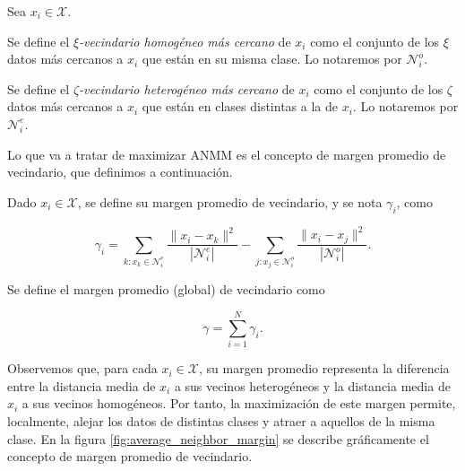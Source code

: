 \documentclass{book}
\begin{document}
\begin{definition}
	Sea $x_i \in \mathcal{X}$.
	
	Se define el \emph{$\xi$-vecindario homogéneo más cercano} de $x_i$ como el conjunto de los $\xi$ datos más cercanos a $x_i$ que están en su misma clase. Lo notaremos por $\mathcal{N}_i^o$.
	
	Se define el \emph{$\zeta$-vecindario heterogéneo más cercano} de $x_i$ como el conjunto de los $\zeta$ datos más cercanos a $x_i$ que están en clases distintas a la de $x_i$. Lo notaremos por $\mathcal{N}_i^e$.
\end{definition} 

Lo que va a tratar de maximizar ANMM es el concepto de margen promedio de vecindario, que definimos a continuación.

\begin{definition}
	Dado $x_i \in \mathcal{X}$, se define su margen promedio de vecindario, y se nota $\gamma_i$, como
	
	\begin{equation}
		\gamma_i = \sum\limits_{k \colon x_k \in \mathcal{N}_i^e} \frac{\|x_i - x_k \|^2}{|\mathcal{N}_i^e|} - \sum\limits_{j \colon x_j \in \mathcal{N}_i^o} \frac{\|x_i - x_j \|^2}{|\mathcal{N}_i^o|}.
	\end{equation}
	
	Se define el margen promedio (global) de vecindario como
	
	\begin{equation}
		\gamma = \sum_{i=1}^N \gamma_i.
	\end{equation}

	
\end{definition}

Observemos que, para cada $x_i \in \mathcal{X}$, su margen promedio representa la diferencia entre la distancia media de $x_i$ a sus vecinos heterogéneos y la distancia media de $x_i$ a sus vecinos homogéneos. Por tanto, la maximización de este margen permite, localmente, alejar los datos de distintas clases y atraer a aquellos de la misma clase. En la figura \ref{fig:average_neighbor_margin} se describe gráficamente el concepto de margen promedio de vecindario.
\end{document}
